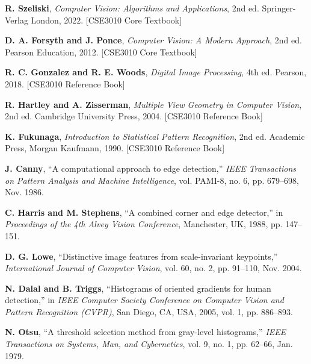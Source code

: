 \begin{enumerate}[label={[\arabic*]}]
    \item \textbf{R. Szeliski}, \textit{Computer Vision: Algorithms and Applications}, 2nd ed. Springer-Verlag London, 2022. [CSE3010 Core Textbook]
    
    \item \textbf{D. A. Forsyth and J. Ponce}, \textit{Computer Vision: A Modern Approach}, 2nd ed. Pearson Education, 2012. [CSE3010 Core Textbook]
    
    \item \textbf{R. C. Gonzalez and R. E. Woods}, \textit{Digital Image Processing}, 4th ed. Pearson, 2018. [CSE3010 Reference Book]
    
    \item \textbf{R. Hartley and A. Zisserman}, \textit{Multiple View Geometry in Computer Vision}, 2nd ed. Cambridge University Press, 2004. [CSE3010 Reference Book]
    
    \item \textbf{K. Fukunaga}, \textit{Introduction to Statistical Pattern Recognition}, 2nd ed. Academic Press, Morgan Kaufmann, 1990. [CSE3010 Reference Book]
    
    \item \textbf{J. Canny}, ``A computational approach to edge detection,'' \textit{IEEE Transactions on Pattern Analysis and Machine Intelligence}, vol. PAMI-8, no. 6, pp. 679--698, Nov. 1986.
    
    \item \textbf{C. Harris and M. Stephens}, ``A combined corner and edge detector,'' in \textit{Proceedings of the 4th Alvey Vision Conference}, Manchester, UK, 1988, pp. 147--151.
    
    \item \textbf{D. G. Lowe}, ``Distinctive image features from scale-invariant keypoints,'' \textit{International Journal of Computer Vision}, vol. 60, no. 2, pp. 91--110, Nov. 2004.
    
    \item \textbf{N. Dalal and B. Triggs}, ``Histograms of oriented gradients for human detection,'' in \textit{IEEE Computer Society Conference on Computer Vision and Pattern Recognition (CVPR)}, San Diego, CA, USA, 2005, vol. 1, pp. 886--893.
    
    \item \textbf{N. Otsu}, ``A threshold selection method from gray-level histograms,'' \textit{IEEE Transactions on Systems, Man, and Cybernetics}, vol. 9, no. 1, pp. 62--66, Jan. 1979.
    

\end{enumerate}
